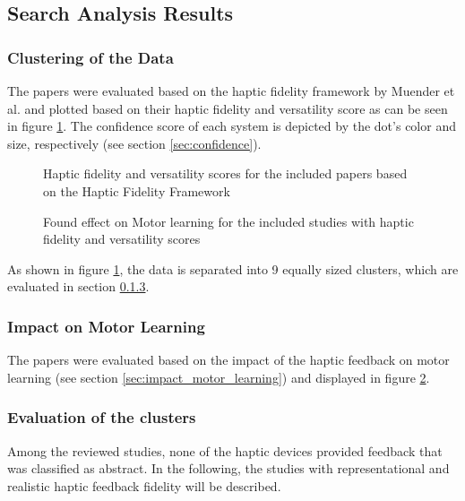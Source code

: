 \subsection{Search Analysis Results}

\subsubsection{Clustering of the Data}
The papers were evaluated based on the haptic fidelity framework by Muender et al. \cite{Muender2022HapticReality} and plotted based on their haptic fidelity and versatility score as can be seen in figure \ref{fig:fidelity_plot}. The confidence score of each system is depicted by the dot's color and size, respectively (see section \ref{sec:confidence}). 

\begin{figure}[!htbp]
\resizebox{0.99\textwidth}{!}{}
\caption{Haptic fidelity and versatility scores for the included papers based on the Haptic Fidelity Framework}
\label{fig:fidelity_plot}
\end{figure}

\begin{figure}[!htbp]
\resizebox{0.99\textwidth}{!}{}
\caption{Found effect on Motor learning for the included studies with haptic fidelity and versatility scores}
\label{fig:motorlearning_plot}
\end{figure}


As shown in figure \ref{fig:fidelity_plot}, the data is separated into 9 equally sized clusters, which are evaluated in section \ref{sec:evaluation_clusters}.


\subsubsection{Impact on Motor Learning}
The papers were evaluated based on the impact of the haptic feedback on motor learning (see section \ref{sec:impact_motor_learning}) and displayed in figure \ref{fig:motorlearning_plot}.


\subsubsection{Evaluation of the clusters}
\label{sec:evaluation_clusters}

Among the reviewed studies, none of the haptic devices provided feedback that was classified as abstract.
In the following, the studies with representational and realistic haptic feedback fidelity will be described.

